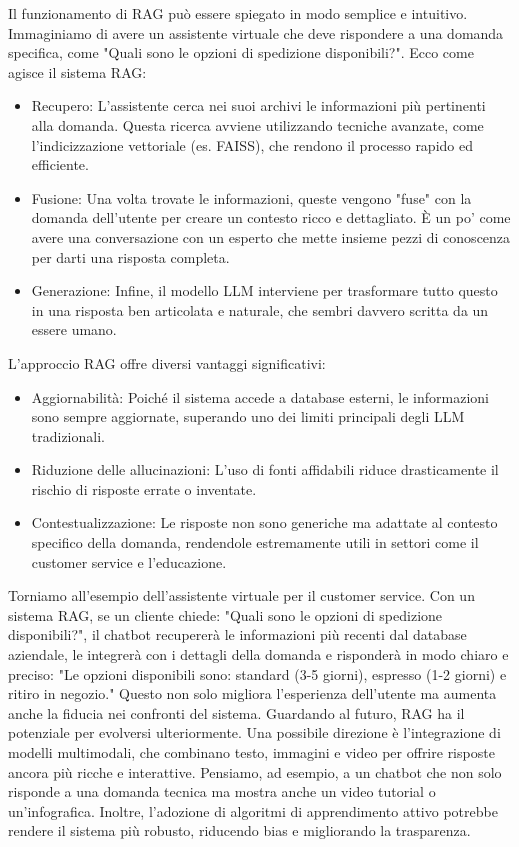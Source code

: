 \documentclass[a4paper,twoside,12pt]{toptesi}
\begin{document}
Il funzionamento di RAG può essere spiegato in modo semplice e intuitivo. Immaginiamo di avere un assistente virtuale che deve rispondere a una domanda specifica, come "Quali sono le opzioni di spedizione disponibili?". Ecco come agisce il sistema RAG:
\begin{itemize}
\item Recupero:  L'assistente cerca nei suoi archivi le informazioni più pertinenti alla domanda. Questa ricerca avviene utilizzando tecniche avanzate, come l'indicizzazione vettoriale (es. FAISS), che rendono il processo rapido ed efficiente.
\item Fusione: Una volta trovate le informazioni, queste vengono "fuse" con la domanda dell'utente per creare un contesto ricco e dettagliato. È un po' come avere una conversazione con un esperto che mette insieme pezzi di conoscenza per darti una risposta completa.
\item Generazione:  Infine, il modello LLM interviene per trasformare tutto questo in una risposta ben articolata e naturale, che sembri davvero scritta da un essere umano.
\end{itemize}

L'approccio RAG offre diversi vantaggi significativi:

\begin{itemize}
\item Aggiornabilità: Poiché il sistema accede a database esterni, le informazioni sono sempre aggiornate, superando uno dei limiti principali degli LLM tradizionali.
\item Riduzione delle allucinazioni: L'uso di fonti affidabili riduce drasticamente il rischio di risposte errate o inventate.
\item Contestualizzazione:  Le risposte non sono generiche ma adattate al contesto specifico della domanda, rendendole estremamente utili in settori come il customer service e l'educazione.
\end{itemize}

Torniamo all'esempio dell'assistente virtuale per il customer service. Con un sistema RAG, se un cliente chiede: "Quali sono le opzioni di spedizione disponibili?", il chatbot recupererà le informazioni più recenti dal database aziendale, le integrerà con i dettagli della domanda e risponderà in modo chiaro e preciso: "Le opzioni disponibili sono: standard (3-5 giorni), espresso (1-2 giorni) e ritiro in negozio." Questo non solo migliora l'esperienza dell'utente ma aumenta anche la fiducia nei confronti del sistema. Guardando al futuro, RAG ha il potenziale per evolversi ulteriormente. Una possibile direzione è l'integrazione di modelli multimodali, che combinano testo, immagini e video per offrire risposte ancora più ricche e interattive. Pensiamo, ad esempio, a un chatbot che non solo risponde a una domanda tecnica ma mostra anche un video tutorial o un'infografica. Inoltre, l'adozione di algoritmi di apprendimento attivo potrebbe rendere il sistema più robusto, riducendo bias e migliorando la trasparenza.
\end{document}
